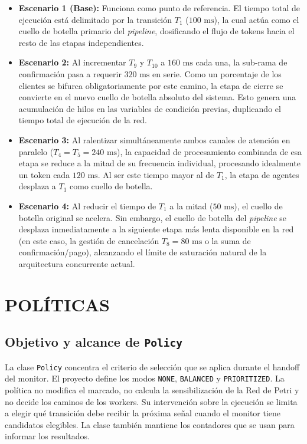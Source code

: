 \documentclass[11pt,a4paper]{article}
\begin{document}
\begin{itemize}
    \item \textbf{Escenario 1 (Base):} Funciona como punto de referencia. El tiempo total de ejecución está delimitado por la transición $T_1$ ($100 \text{ ms}$), la cual actúa como el cuello de botella primario del \textit{pipeline}, dosificando el flujo de tokens hacia el resto de las etapas independientes.
    \item \textbf{Escenario 2:} Al incrementar $T_9$ y $T_{10}$ a $160 \text{ ms}$ cada una, la sub-rama de confirmación pasa a requerir $320 \text{ ms}$ en serie. Como un porcentaje de los clientes se bifurca obligatoriamente por este camino, la etapa de cierre se convierte en el nuevo cuello de botella absoluto del sistema. Esto genera una acumulación de hilos en las variables de condición previas, duplicando el tiempo total de ejecución de la red.
    \item \textbf{Escenario 3:} Al ralentizar simultáneamente ambos canales de atención en paralelo ($T_4 = T_5 = 240 \text{ ms}$), la capacidad de procesamiento combinada de esa etapa se reduce a la mitad de su frecuencia individual, procesando idealmente un token cada $120 \text{ ms}$. Al ser este tiempo mayor al de $T_1$, la etapa de agentes desplaza a $T_1$ como cuello de botella.
    \item \textbf{Escenario 4:} Al reducir el tiempo de $T_1$ a la mitad ($50 \text{ ms}$), el cuello de botella original se acelera. Sin embargo, el cuello de botella del \textit{pipeline} se desplaza inmediatamente a la siguiente etapa más lenta disponible en la red (en este caso, la gestión de cancelación $T_8 = 80 \text{ ms}$ o la suma de confirmación/pago), alcanzando el límite de saturación natural de la arquitectura concurrente actual.
\end{itemize}

\section{POLÍTICAS}

\subsection{Objetivo y alcance de \texttt{Policy}}

La clase \texttt{Policy} concentra el criterio de selección que se aplica durante el handoff del monitor. El proyecto define los modos \texttt{NONE}, \texttt{BALANCED} y \texttt{PRIORITIZED}. La política no modifica el marcado, no calcula la sensibilización de la Red de Petri y no decide los caminos de los workers. Su intervención sobre la ejecución se limita a elegir qué transición debe recibir la próxima señal cuando el monitor tiene candidatos elegibles. La clase también mantiene los contadores que se usan para informar los resultados.
\end{document}
